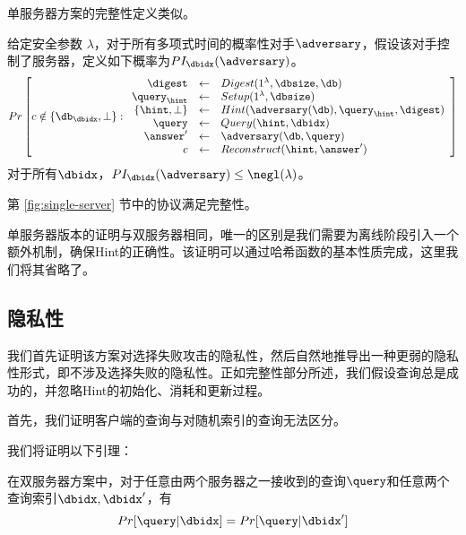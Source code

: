 单服务器方案的完整性定义类似。

\begin{definition}[单服务器方案的完整性]
    给定安全参数 $\lambda$，对于所有多项式时间的概率性对手$\adversary$，假设该对手控制了服务器，定义如下概率为$PI_\dbidx(\adversary)$。
$$ Pr\left[
            c \notin \{\db_\dbidx,\bot\}:
            \begin{array}{rcl}
                \digest        & \leftarrow & Digest(1^\lambda, \dbsize, \db)              \\
                \query_\hint   & \leftarrow & Setup(1^\lambda, \dbsize)                    \\
                \{\hint,\bot\} & \leftarrow & Hint(\adversary(\db), \query_\hint, \digest) \\
                \query         & \leftarrow & Query(\hint, \dbidx)                         \\
                \answer'       & \leftarrow & \adversary(\db, \query)                      \\
                c              & \leftarrow & Reconstruct(\hint, \answer')                 \\
            \end{array}
            \right]$$
对于所有$\dbidx$，$PI_\dbidx(\adversary) \leq \negl(\lambda)$。
\end{definition}

\begin{theorem}
第 \ref{fig:single-server} 节中的协议满足完整性。
\end{theorem}

单服务器版本的证明与双服务器相同，唯一的区别是我们需要为离线阶段引入一个额外机制，确保Hint的正确性。该证明可以通过哈希函数的基本性质完成，这里我们将其省略了。

\subsection{隐私性}

我们首先证明该方案对选择失败攻击的隐私性，然后自然地推导出一种更弱的隐私性形式，即不涉及选择失败的隐私性。正如完整性部分所述，我们假设查询总是成功的，并忽略Hint的初始化、消耗和更新过程。

首先，我们证明客户端的查询与对随机索引的查询无法区分。

我们将证明以下引理：

\begin{lemma}
\label{lemma:privacy}
    在双服务器方案中，对于任意由两个服务器之一接收到的查询$\query$和任意两个查询索引$\dbidx,\dbidx'$，有
    $$Pr[\query|\dbidx] = Pr[\query|\dbidx']$$
\end{lemma}

